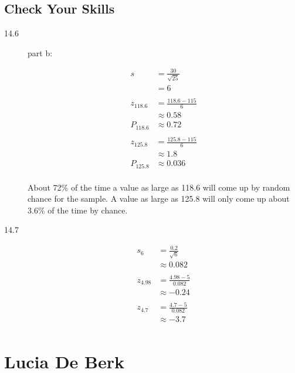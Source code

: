 \documentclass[letterpaper, landscape]{exam}
\begin{document}
  \subsection{Check Your Skills}
  \begin{description}
    \item[14.6]

      part b:

      \begin{align*}
        s          & = \frac{30}{\sqrt{25}} \\
                   & = 6 \\
        \\
        z_{118.6} & = \frac{118.6 - 115}{6} \\
                  & \approx 0.58 \\
        P_{118.6} & \approx 0.72 \\
        \\
        z_{125.8} & = \frac{125.8 - 115}{6} \\
                  & \approx 1.8 \\
        P_{125.8} & \approx 0.036 \\
      \end{align*}

      About 72\% of the time a value as large as 118.6 will come up by random
      chance for the sample. A value as large as 125.8 will only come up about
      3.6\% of the time by chance.

    \item[14.7]
      \begin{align*}
        s_6 &= \frac{0.2}{\sqrt{6}} \\
        &\approx 0.082 \\
        \\
        z_{4.98} & = \frac{4.98 - 5}{0.082} \\
                 & \approx -0.24 \\
        \\
        z_{4.7} & = \frac{4.7 - 5}{0.082} \\
                & \approx -3.7 \\
      \end{align*}
  \end{description}

  \section{Lucia De Berk}
\end{document}
